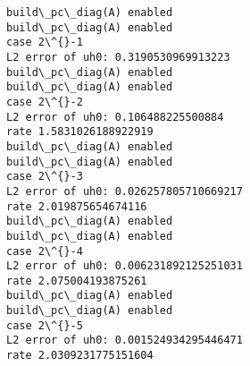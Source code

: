\documentclass[11pt]{article}
\begin{document}
    \begin{Verbatim}[commandchars=\\\{\}]
build\_pc\_diag(A) enabled
build\_pc\_diag(A) enabled
case 2\^{}-1
L2 error of uh0: 0.3190530969913223
build\_pc\_diag(A) enabled
build\_pc\_diag(A) enabled
case 2\^{}-2
L2 error of uh0: 0.106488225500884
rate 1.5831026188922919
build\_pc\_diag(A) enabled
build\_pc\_diag(A) enabled
case 2\^{}-3
L2 error of uh0: 0.026257805710669217
rate 2.019875654674116
build\_pc\_diag(A) enabled
build\_pc\_diag(A) enabled
case 2\^{}-4
L2 error of uh0: 0.006231892125251031
rate 2.075004193875261
build\_pc\_diag(A) enabled
build\_pc\_diag(A) enabled
case 2\^{}-5
L2 error of uh0: 0.001524934295446471
rate 2.0309231775151604
    \end{Verbatim}

    
    

    
    
    
\end{document}
